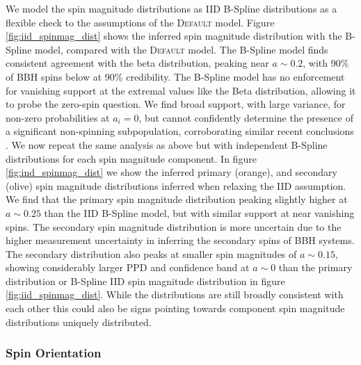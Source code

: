 We model the spin magnitude distributions as IID B-Spline distributions as a flexible check to the assumptions of the \textsc{Default} model. 
Figure \ref{fig:iid_spinmag_dist} shows the inferred spin magnitude distribution with the B-Spline model, compared with the \textsc{Default} model. 
The B-Spline model finds consistent agreement with the beta distribution, peaking near $a\sim0.2$, with 90\% of BBH spins below 
\result{$\CIPlusMinus{\macros[BSplineIIDCompSpins][a_90percentile]}$} at 90\% credibility. The B-Spline model has no enforcement for vanishing support at the extremal values like the Beta distribution, 
allowing it to probe the zero-spin question. We find broad support, with large variance, for non-zero probabilities at $a_i=0$, but cannot confidently determine the presence of 
a significant non-spinning subpopulation, corroborating similar recent conclusions \citep{BuildBetterSpinModels,Callister_NoEvidence,GWTC3MonashSpin}. 
We now repeat the same analysis as above but with independent B-Spline distributions for each spin magnitude component. In figure \ref{fig:ind_spinmag_dist} 
we show the inferred primary (orange), and secondary (olive) spin magnitude distributions inferred when relaxing the IID assumption. We find that the primary spin magnitude distribution 
peaking slightly higher at $a\sim0.25$ than the IID B-Spline model, but with similar support at near vanishing spins. The secondary spin magnitude distribution is more uncertain due to the 
higher measurement uncertainty in inferring the secondary spins of BBH systems. The secondary distribution also peaks at smaller spin magnitudes of $a\sim0.15$, showing considerably larger 
PPD and confidence band at $a\sim0$ than the primary distribution or B-Spline IID spin magnitude distribution in figure \ref{fig:iid_spinmag_dist}. While the distributions are still broadly 
consistent with each other this could also be signs pointing towards component spin magnitude distributions uniquely distributed. 

\subsubsection{Spin Orientation}

